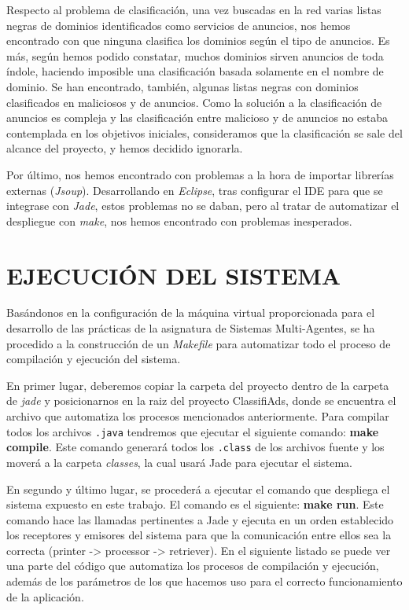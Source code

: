 \documentclass{pre-tfg}
\begin{document}
Respecto al problema de clasificación, una vez buscadas en la red varias listas negras de dominios identificados como servicios de anuncios, nos hemos encontrado
con que ninguna clasifica los dominios según el tipo de anuncios. Es más, según hemos podido constatar, muchos dominios sirven anuncios de toda índole, haciendo imposible
una clasificación basada solamente en el nombre de dominio. Se han encontrado, también, algunas listas negras con dominios clasificados en maliciosos y de anuncios. Como la
solución a la clasificación de anuncios es compleja y las clasificación entre malicioso y de anuncios no estaba contemplada en los objetivos iniciales, consideramos que la
clasificación se sale del alcance del proyecto, y hemos decidido ignorarla.

Por último, nos hemos encontrado con problemas a la hora de importar librerías externas (\textit{Jsoup}). Desarrollando en \textit{Eclipse}, tras configurar el IDE para que
se integrase con \textit{Jade}, estos problemas no se daban, pero al tratar de automatizar el despliegue con \textit{make}, nos hemos encontrado con problemas inesperados.

\section{EJECUCIÓN DEL SISTEMA}

Basándonos en la configuración de la máquina virtual proporcionada para el desarrollo de las prácticas de la asignatura de Sistemas Multi-Agentes, 
se ha procedido a la construcción de un \textit{Makefile} para automatizar todo el proceso de compilación y ejecución
del sistema.

En primer lugar, deberemos copiar la carpeta del proyecto dentro de la carpeta de \textit{jade} y posicionarnos en la raiz del proyecto ClassifiAds, 
donde se encuentra el archivo que automatiza los procesos mencionados anteriormente. Para compilar todos los archivos \verb|.java| tendremos 
que ejecutar el siguiente comando: \textbf{make compile}. Este comando generará todos los \verb|.class| de los archivos fuente y los moverá a la carpeta \textit{classes}, la cual usará Jade para ejecutar el sistema.

En segundo y último lugar, se procederá a ejecutar el comando que despliega el sistema expuesto en este trabajo. El comando es el siguiente:
\textbf{make run}. Este comando hace las llamadas pertinentes a Jade y ejecuta en un orden establecido los receptores y emisores del sistema
para que la comunicación entre ellos sea la correcta (printer -> processor -> retriever). En el siguiente listado se puede ver una parte del código que automatiza los procesos de compilación y 
ejecución, además de los parámetros de los que hacemos uso para el correcto funcionamiento de la aplicación.
\end{document}
